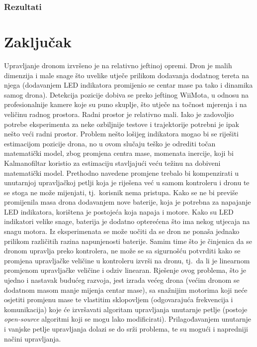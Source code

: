\documentclass[times, utf8, diplomski]{fer}
\begin{document}
\subsection{Rezultati}
 


\chapter{Zaključak}
Upravljanje dronom izvršeno je na relativno jeftinoj opremi. Dron je malih dimenzija i male snage što uvelike utječe prilikom dodavanja dodatnog tereta na njega (dodavanjem LED indikatora promijenio se centar mase pa tako i dinamika samog drona). Detekcija pozicije dobiva se preko jeftinog WiiMota, u odnosu na profesionalnije kamere koje su puno skuplje, što utječe na točnost mjerenja i na veličinu radnog prostora. Radni prostor je relativno mali. Iako je zadovoljio potrebe eksperimenta za neke ozbiljnije testove i trajektorije potrebni je ipak nešto veći radni prostor. Problem nešto lošijeg indikatora mogao bi se riješiti estimacijom pozicije drona, no u ovom slučaju teško je odrediti točan matematički model, zbog promjena centra mase, momenata inercije, koji bi Kalmanofiltar koristio za estimaciju stavljajući veću težinu na dobiveni matematički model. Prethodno navedene promjene trebalo bi kompenzirati u unutarnjoj upravljačkoj petlji koja je riješena već u samom kontroleru i dronu te se stoga ne može mijenjati, tj.~korisnik nema pristupa. Kako se ne bi previše promijenila masa drona dodavanjem nove baterije, koja je potrebna za napajanje LED indikatora, korištena je postojeća koja napaja i motore. Kako su LED indikatori velike snage, baterija je dodatno opterećena što ima nekog utjecaja na snagu motora. Iz eksperimenata se može uočiti da se dron ne ponaša jednako prilikom različitih razina napunjenosti baterije. Samim time što je činjenica da se dronom upravlja preko kontrolera, ne može se sa sigurnošću potvrditi kako se promjena upravljačke veličine u kontroleru izvrši na dronu, tj.~da li je linearnom promjenom upravljačke veličine i odziv linearan. Rješenje ovog problema, što je ujedno i nastavak budućeg razvoja, jest izrada većeg drona (većim dronom se dodatnom masom manje mijenja centar mase), sa snažnijim motorima koji neće osjetiti promjenu mase te vlastitim sklopovljem (odgovarajuća frekvencija i komunikacija) koje će izvršavati algoritam upravljanja unutarnje petlje (postoje \emph{open-source} algoritmi koji se mogu lako modificirati). Prilagođavanjem unutarnje i vanjske petlje upravljanja dolazi se do srži problema, te su mogući i napredniji načini upravljanja.
\end{document}
